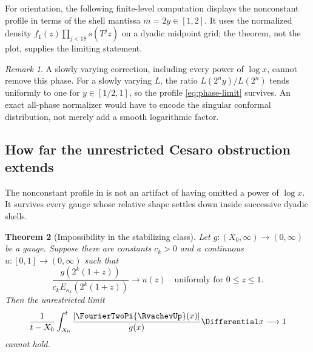 \documentclass[11pt,oneside]{article}
\numberwithin{equation}{section}
\newtheorem{theorem}{Theorem}[section]
\theoremstyle{definition}
\theoremstyle{remark}
\newtheorem{remark}[theorem]{Remark}
\newcommand{\ShellPhaseProfile}{P_{\mathrm{phase}}}
\begin{document}
For orientation, the following finite-level computation displays the nonconstant profile in
terms of the shell mantissa $m=2y\in[1,2]$.  It uses the normalized density
$f_1(z)\prod_{j<18}s(T^jz)$ on a dyadic midpoint grid; the theorem, not the plot, supplies
the limiting statement.

\begin{center}
\end{center}

\begin{remark}
A slowly varying correction, including every power of $\log x$, cannot remove this phase.
For a slowly varying $L$, the ratio $L(2^ny)/L(2^n)$ tends uniformly to one for
$y\in[1/2,1]$, so the profile \eqref{eq:phase-limit} survives.  An exact all-phase
normalizer would have to encode the singular conformal distribution, not merely add a
smooth logarithmic factor.
\end{remark}


\subsection{How far the unrestricted Cesaro obstruction extends}
\label{subsec:stabilizing-gauges}

The nonconstant profile in  is not an artifact of having omitted a
power of $\log x$.  It survives every gauge whose relative shape settles down inside
successive dyadic shells.

\begin{theorem}[Impossibility in the stabilizing class]
\label{thm:stabilizing-impossibility}
Let $g:(X_0,\infty)\to(0,\infty)$ be a gauge.  Suppose there are constants $c_k>0$ and a
continuous $u:[0,1]\to(0,\infty)$ such that
\begin{equation}
 \frac{g(2^k(1+z))}{c_kE_{\kappa_1}(2^k(1+z))}
 \longrightarrow u(z)
 \quad\text{uniformly for }0\le z\le1.
 \label{eq:stabilizing-shape}
\end{equation}
Then the unrestricted limit
\begin{equation}
 \frac1{t-X_0}\int_{X_0}^t\frac{|\FourierTwoPi{\RvachevUp}(x)|}{g(x)}\Differential x\longrightarrow1
 \label{eq:Q2-final}
\end{equation}
cannot hold.
\end{theorem}
\end{document}
